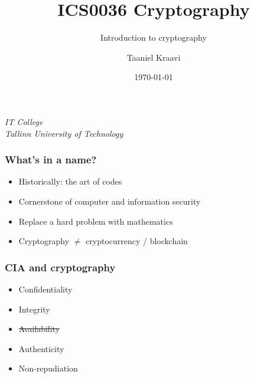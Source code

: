 \usepackage{soul}

\title{ICS0036 Cryptography}
\subtitle{Introduction to cryptography}
\date{\today}
\author{Taaniel Kraavi}
\institute%
{%
  \textit{IT College}\\
  \textit{Tallinn University of Technology}
}


\begin{frame}
  \titlepage
\end{frame}

\begin{frame}
  \frametitle{What's in a name?}

  \pause
  \begin{itemize}[<+(1)->]
    \item Historically: the art of codes
    \item Cornerstone of computer and information security
    \item Replace a hard problem with mathematics
    \item Cryptography $\neq$ cryptocurrency / blockchain
  \end{itemize}
\end{frame}

\begin{frame}
  \frametitle{CIA and cryptography}

  \pause
  \begin{itemize}
    \item Confidentiality
    \item Integrity
    \item \st{Availability}
    \pause
    \item Authenticity
    \item Non-repudiation
  \end{itemize}
\end{frame}

